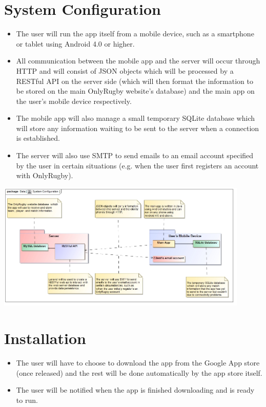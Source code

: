 \documentclass[hidelinks,a4paper,12pt]{article}
\begin{document}
\section{System Configuration}
\begin {itemize}
	\item The user will run the app itself from a mobile device, such as a smartphone or tablet using Android 4.0 or higher.
	\item All communication between the mobile app and the server will occur through HTTP and will consist of JSON objects which will be processed by a RESTful API on the server side (which will then format the information to be stored on the main OnlyRugby website's database) and the main app on the user's mobile device respectively.
	\item The mobile app will also manage a small temporary SQLite database which will store any information waiting to be sent to the server when a connection is established.
	\item The server will also use SMTP to send emails to an email account specified by the user in certain situations (e.g. when the user first registers an account with OnlyRugby). 
\end{itemize}
\begin{center}
  	 \includegraphics[width=0.9\textwidth] {./images/System_Configuration.jpg}\\[0.4cm]
\end{center}
\section{Installation}
\begin {itemize}
	\item The user will have to choose to download the app from the Google App store (once released) and the rest will be done automatically by the app store itself.
	\item The user will be notified when the app is finished downloading and is ready to run.
\end{itemize}
\end{document}
